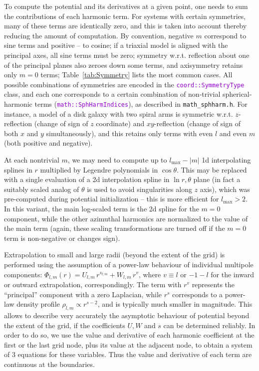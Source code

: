 \documentclass[12pt]{article}
\newcommand{\ttt}[1]{\textcolor{darkviolet}{\texttt{#1}}}
\begin{document}
To compute the potential and its derivatives at a given point, one needs to sum the contributions of each harmonic term. For systems with certain symmetries, many of these terms are identically zero, and this is taken into account thereby reducing the amount of computation. By convention, negative $m$ correspond to sine terms and positive -- to cosine; if a triaxial model is aligned with the principal axes, all sine terms must be zero; symmetry w.r.t. reflection about one of the principal planes also zeroes down some terms, and axisymmetry retains only $m=0$ terms; Table~\ref{tab:Symmetry} lists the most common cases. All possible combinations of symmetries are encoded in the \ttt{coord::SymmetryType} class, and each one corresponds to a certain combination of non-trivial spherical-harmonic terms (\ttt{math::SphHarmIndices}), as described in \texttt{math_sphharm.h}. For instance, a model of a disk galaxy with two spiral arms is symmetric w.r.t. $z$-reflection (change of sign of $z$ coordinate) and $xy$-reflection (change of sign of both $x$ and $y$ simultaneously), and this retains only terms with even $l$ and even $m$ (both positive and negative).

At each nontrivial $m$, we may need to compute up to $l_\mathrm{max}-|m|$ 1d interpolating splines in $r$ multiplied by Legendre polynomials in $\cos\theta$. This may be replaced with a single evaluation of a 2d interpolation spline in $\ln r,\theta$ plane (in fact a suitably scaled analog of $\theta$ is used to avoid singularities along $z$ axis), which was pre-computed during potential initialization -- this is more efficient for $l_\mathrm{max}>2$. In this variant, the main log-scaled term is the 2d spline for the $m=0$ component, while the other azimuthal harmonics are normalized to the value of the main term (again, these scaling transformations are turned off if the $m=0$ term is non-negative or changes sign).

Extrapolation to small and large radii (beyond the extent of the grid) is performed using the assumption of a power-law behaviour of individual multipole components: $\Phi_{l,m}(r) = U_{l,m}\, r^{s_{l,m}} + W_{l,m}\, r^{v}$, where $v\equiv l$ or $-1-l$ for the inward or outward extrapolation, correspondingly. The term with $r^v$ represents the ``principal'' component with a zero Laplacian, while $r^s$ corresponds to a power-law density profile $\rho_{l,m}\propto r^{s-2}$, and is typically much smaller in magnitude. This allows to describe very accurately the asymptotic behaviour of potential beyond the extent of the grid, if the coefficients $U,W$ and $s$ can be determined reliably. In order to do so, we use the value and derivative of each harmonic coefficient at the first or the last grid node, plus its value at the adjacent node, to obtain a system of 3 equations for these variables. Thus the value and derivative of each term are continuous at the boundaries. 
\end{document}
